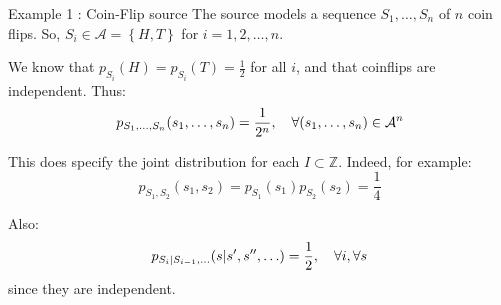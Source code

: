 \documentclass[a4paper]{article}
\begin{document}
\begin{parag}{Example 1 : Coin-Flip source}
    The source models a sequence $S_1, \ldots, S_n$ of $n$ coin flips. So, $S_i \in \mathcal{A} = \left\{H, T\right\}$ for $i = 1, 2, \ldots, n$.

    We know that $p_{S_i}\left(H\right) = p_{S_i}\left(T\right) = \frac{1}{2}$ for all $i$, and that coinflips are independent. Thus: 
    \[p_{S_1, \ldots, S_n} \left(s_1, \ldots, s_n\right) = \frac{1}{2^{n}}, \mathspace \forall \left(s_1, \ldots, s_n\right) \in \mathcal{A}^{n}\]
    
    This does specify the joint distribution for each $I \subset \mathbb{Z}$. Indeed, for example: 
    \[p_{S_1, S_2}\left(s_1, s_2\right) = p_{S_1}\left(s_1\right) p_{S_2}\left(s_2\right) = \frac{1}{4}\]
    
    Also: 
    \[p_{S_i | S_{i-1}, \ldots}\left(s | s', s'', \ldots\right) = \frac{1}{2}, \mathspace \forall i, \forall s\]
    since they are independent.
\end{parag}
\end{document}
